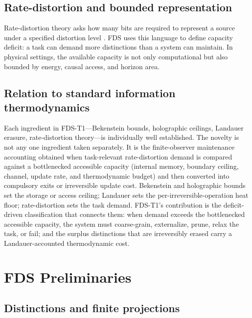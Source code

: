 \documentclass[10pt,a4paper,twocolumn,aps,prl]{revtex4-2}
\begin{document}
\subsection{Rate-distortion and bounded representation}

Rate-distortion theory asks how many bits are required to represent a source under a specified distortion level \cite{shannon1948,shannon1959,berger1971,cover2006}. FDS uses this language to define capacity deficit: a task can demand more distinctions than a system can maintain. In physical settings, the available capacity is not only computational but also bounded by energy, causal access, and horizon area.

\subsection{Relation to standard information thermodynamics}

Each ingredient in FDS-T1---Bekenstein bounds, holographic ceilings, Landauer erasure, rate-distortion theory---is individually well established. The novelty is not any one ingredient taken separately. It is the finite-observer maintenance accounting obtained when task-relevant rate-distortion demand is compared against a bottlenecked accessible capacity (internal memory, boundary ceiling, channel, update rate, and thermodynamic budget) and then converted into compulsory exits or irreversible update cost. Bekenstein and holographic bounds set the storage or access ceiling; Landauer sets the per-irreversible-operation heat floor; rate-distortion sets the task demand. FDS-T1's contribution is the deficit-driven classification that connects them: when demand exceeds the bottlenecked accessible capacity, the system must coarse-grain, externalize, prune, relax the task, or fail; and the surplus distinctions that are irreversibly erased carry a Landauer-accounted thermodynamic cost.

\section{FDS Preliminaries}

\subsection{Distinctions and finite projections}
\end{document}
